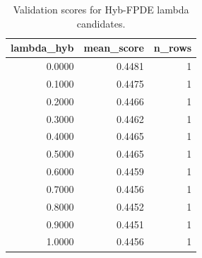 \begin{table}[t]
\caption{Validation scores for Hyb-FPDE lambda candidates.}
\label{tab:lambda_distribution_computed}
\centering
\begin{tabular}{rrr}
\toprule
lambda\_hyb & mean\_score & n\_rows \\
\midrule
0.0000 & 0.4481 & 1 \\
0.1000 & 0.4475 & 1 \\
0.2000 & 0.4466 & 1 \\
0.3000 & 0.4462 & 1 \\
0.4000 & 0.4465 & 1 \\
0.5000 & 0.4465 & 1 \\
0.6000 & 0.4459 & 1 \\
0.7000 & 0.4456 & 1 \\
0.8000 & 0.4452 & 1 \\
0.9000 & 0.4451 & 1 \\
1.0000 & 0.4456 & 1 \\
\bottomrule
\end{tabular}

\end{table}
